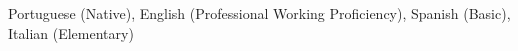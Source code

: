 
Portuguese (Native), English (Professional Working Proficiency), Spanish (Basic), Italian (Elementary)

